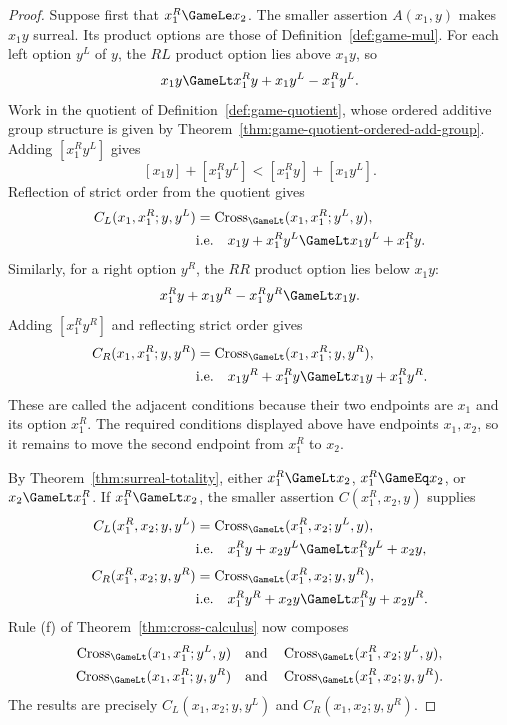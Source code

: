 \begin{proof}
  Suppose first that \(x_1^R\GameLe x_2\).  The smaller assertion
  \(A(x_1,y)\) makes \(x_1y\) surreal.  Its product options are those of
  Definition~\ref{def:game-mul}.  For each left option \(y^L\) of \(y\), the
  \(RL\) product option lies above \(x_1y\), so
  \[
    x_1y\GameLt x_1^Ry+x_1y^L-x_1^Ry^L.
  \]
  Work in the quotient of Definition~\ref{def:game-quotient}, whose ordered additive group
  structure is given by Theorem~\ref{thm:game-quotient-ordered-add-group}.  Adding
  \([x_1^Ry^L]\) gives
  \[
    [x_1y]+[x_1^Ry^L]<[x_1^Ry]+[x_1y^L].
  \]
  Reflection of strict order from the quotient gives
  \[
    \begin{aligned}
      C_L(x_1,x_1^R;y,y^L)
        &=\operatorname{Cross}_{\GameLt}(x_1,x_1^R;y^L,y),\\
        &\text{i.e.}\quad
          x_1y+x_1^Ry^L\GameLt x_1y^L+x_1^Ry.
    \end{aligned}
  \]
  Similarly, for a right option \(y^R\),
  the \(RR\) product option lies below \(x_1y\):
  \[
    x_1^Ry+x_1y^R-x_1^Ry^R\GameLt x_1y.
  \]
  Adding \([x_1^Ry^R]\) and reflecting strict order gives
  \[
    \begin{aligned}
      C_R(x_1,x_1^R;y,y^R)
        &=\operatorname{Cross}_{\GameLt}(x_1,x_1^R;y,y^R),\\
        &\text{i.e.}\quad
          x_1y^R+x_1^Ry\GameLt x_1y+x_1^Ry^R.
    \end{aligned}
  \]
  These are called the adjacent conditions because their two endpoints are
  \(x_1\) and its option \(x_1^R\).  The required conditions displayed above
  have endpoints \(x_1,x_2\), so it remains to move the second endpoint from
  \(x_1^R\) to \(x_2\).

  By Theorem~\ref{thm:surreal-totality}, either
  \(x_1^R\GameLt x_2\), \(x_1^R\GameEq x_2\), or
  \(x_2\GameLt x_1^R\).  If \(x_1^R\GameLt x_2\), the smaller assertion
  \(C(x_1^R,x_2,y)\) supplies
  \[
    \begin{aligned}
      C_L(x_1^R,x_2;y,y^L)
        &=\operatorname{Cross}_{\GameLt}(x_1^R,x_2;y^L,y),\\
        &\text{i.e.}\quad
          x_1^Ry+x_2y^L\GameLt x_1^Ry^L+x_2y,\\[1mm]
      C_R(x_1^R,x_2;y,y^R)
        &=\operatorname{Cross}_{\GameLt}(x_1^R,x_2;y,y^R),\\
        &\text{i.e.}\quad
          x_1^Ry^R+x_2y\GameLt x_1^Ry+x_2y^R.
    \end{aligned}
  \]
  Rule \textup{(f)} of Theorem~\ref{thm:cross-calculus} now composes
  \[
    \begin{gathered}
      \operatorname{Cross}_{\GameLt}(x_1,x_1^R;y^L,y)
      \quad\text{and}\quad
      \operatorname{Cross}_{\GameLt}(x_1^R,x_2;y^L,y),\\
      \operatorname{Cross}_{\GameLt}(x_1,x_1^R;y,y^R)
      \quad\text{and}\quad
      \operatorname{Cross}_{\GameLt}(x_1^R,x_2;y,y^R).
    \end{gathered}
  \]
  The results are precisely
  \(C_L(x_1,x_2;y,y^L)\) and \(C_R(x_1,x_2;y,y^R)\).


\end{proof}
